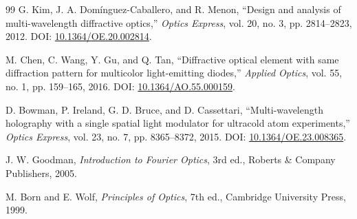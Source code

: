 \documentclass[UTF8,a4paper,12pt]{ctexart}
\begin{document}
\begin{thebibliography}{99}
G. Kim, J. A. Domínguez-Caballero, and R. Menon, ``Design and analysis of multi-wavelength diffractive optics,'' \emph{Optics Express}, vol. 20, no. 3, pp. 2814--2823, 2012. DOI: \href{https://doi.org/10.1364/OE.20.002814}{10.1364/OE.20.002814}.

M. Chen, C. Wang, Y. Gu, and Q. Tan, ``Diffractive optical element with same diffraction pattern for multicolor light-emitting diodes,'' \emph{Applied Optics}, vol. 55, no. 1, pp. 159--165, 2016. DOI: \href{https://doi.org/10.1364/AO.55.000159}{10.1364/AO.55.000159}.

D. Bowman, P. Ireland, G. D. Bruce, and D. Cassettari, ``Multi-wavelength holography with a single spatial light modulator for ultracold atom experiments,'' \emph{Optics Express}, vol. 23, no. 7, pp. 8365--8372, 2015. DOI: \href{https://doi.org/10.1364/OE.23.008365}{10.1364/OE.23.008365}.

J. W. Goodman, \emph{Introduction to Fourier Optics}, 3rd ed., Roberts \& Company Publishers, 2005.

M. Born and E. Wolf, \emph{Principles of Optics}, 7th ed., Cambridge University Press, 1999.
\end{thebibliography}
\end{document}
